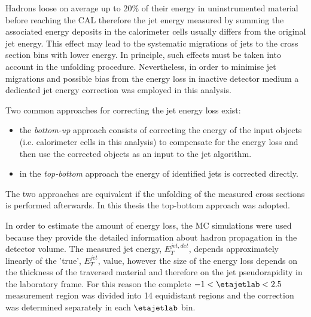 Hadrons loose on average up to 20\% of their energy in uninstrumented material before reaching the CAL therefore the jet energy measured by summing the associated energy deposits in the calorimeter cells usually differs from the original jet energy. This effect may lead to the systematic migrations of jets to the cross section bins with lower energy. In principle, such effects must be taken into account in the unfolding procedure. Nevertheless, in order to minimise jet migrations and possible bias from the energy loss in inactive detector medium a dedicated jet energy correction was employed in this analysis.

Two common approaches for correcting the jet energy loss exist:
\begin{itemize}
 \item the \emph{bottom-up} approach consists of correcting the energy of the input objects (i.e. calorimeter cells in this analysis) to compensate for the energy loss and then use the corrected objects as an input to the jet algorithm.
 \item in the \emph{top-bottom} approach the energy of identified jets is corrected directly.
\end{itemize}
The two approaches are equivalent if the unfolding of the measured cross sections is performed afterwards. In this thesis the top-bottom approach was adopted.

In order to estimate the amount of energy loss, the MC simulations were used because they provide the detailed information about hadron propagation in the detector volume. The measured jet energy, $E_T^{jet,det}$, depends approximately linearly of the 'true', $E_T^{jet}$, value, however the size of the energy loss depends on the thickness of the traversed material and therefore on the jet pseudorapidity in the laboratory frame. For this reason the complete $-1<\etajetlab<2.5$ measurement region was divided into 14 equidistant regions and the correction was determined separately in each $\etajetlab$ bin.

